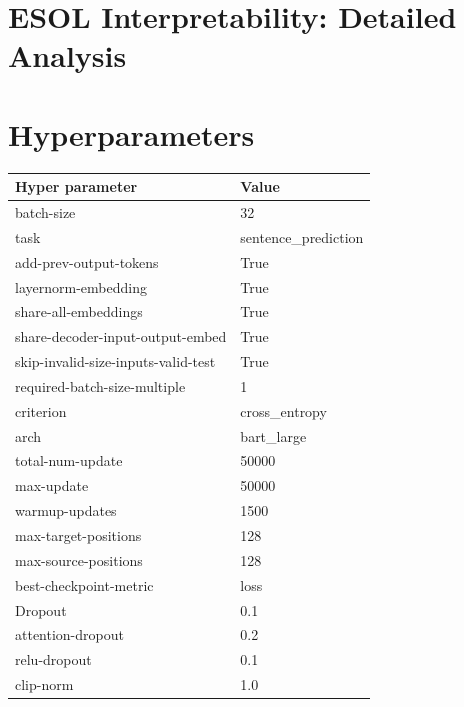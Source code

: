 \documentclass{article} %
\begin{document}
\section{ESOL Interpretability: Detailed Analysis}\label{sec:app-captum-esol}



\section{Hyperparameters}


\begin{table}[h]
\centering
\begin{tabular}{@{}ll@{}}
\toprule
Hyper parameter             & Value                     \\ \midrule
batch-size                  & 32                    \\
task                        & sentence\_prediction  \\
add-prev-output-tokens      & True                  \\
layernorm-embedding         & True                  \\
share-all-embeddings        & True                  \\
share-decoder-input-output-embed         & True     \\
skip-invalid-size-inputs-valid-test      & True     \\
required-batch-size-multiple             & 1        \\
criterion                   & cross\_entropy  \\
arch                        & bart\_large           \\
total-num-update            & 50000   \\
max-update                  & 50000   \\
warmup-updates              & 1500  \\
max-target-positions        & 128                   \\
max-source-positions        & 128                   \\
best-checkpoint-metric      & loss                  \\
Dropout                     & 0.1     \\
attention-dropout           & 0.2                   \\
relu-dropout                & 0.1                   \\
clip-norm                   & 1.0                   \\

\end{tabular}
\end{table}
\end{document}
